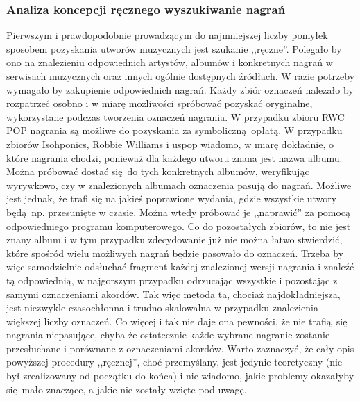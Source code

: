 \subsubsection{Analiza koncepcji ręcznego wyszukiwanie nagrań} Pierwszym i prawdopodobnie
prowadzącym do najmniejszej liczby pomyłek sposobem pozyskania utworów muzycznych jest szukanie
,,ręczne''. Polegało by ono na znalezieniu odpowiednich artystów, albumów i konkretnych nagrań w
serwisach muzycznych oraz innych ogólnie dostępnych źródłach. W razie potrzeby wymagało by
zakupienie odpowiednich nagrań. Każdy zbiór oznaczeń należało by rozpatrzeć osobno i w miarę
możliwości spróbować pozyskać oryginalne, wykorzystane podczas tworzenia oznaczeń nagrania. W
przypadku zbioru RWC POP nagrania są możliwe do pozyskania za symboliczną opłatą. W przypadku
zbiorów Isohponics, Robbie Williams i uspop wiadomo, w miarę dokładnie, o które nagrania chodzi,
ponieważ dla każdego utworu znana jest nazwa albumu. Można próbować dostać się do tych konkretnych
albumów, weryfikując wyrywkowo, czy w znalezionych albumach oznaczenia pasują do nagrań. Możliwe
jest jednak, że trafi się na jakieś poprawione wydania, gdzie wszystkie utwory będą np. przesunięte
w czasie. Można wtedy próbować je ,,naprawić'' za pomocą odpowiedniego programu komputerowego. Co do
pozostałych zbiorów, to nie jest znany album i w tym przypadku zdecydowanie już nie można łatwo
stwierdzić, które spośród wielu możliwych nagrań będzie pasowało do oznaczeń. Trzeba by więc
samodzielnie odsłuchać fragment każdej znalezionej wersji nagrania i znaleźć tą odpowiednią, w
najgorszym przypadku odrzucając wszystkie i pozostając z samymi oznaczeniami akordów. Tak więc
metoda ta, chociaż najdokładniejsza, jest niezwykle czasochłonna i trudno skalowalna w przypadku
znalezienia większej liczby oznaczeń.  Co więcej i tak nie daje ona pewności, że nie trafią się
nagrania niepasujące, chyba że ostatecznie każde wybrane nagranie zostanie przesłuchane i porównane
z oznaczeniami akordów. Warto zaznaczyć, że cały opis powyższej procedury ,,ręcznej'', choć
przemyślany, jest jedynie teoretyczny (nie był zrealizowany od początku do końca) i nie wiadomo,
jakie problemy okazałyby się mało znaczące, a jakie nie zostały wzięte pod uwagę. 

